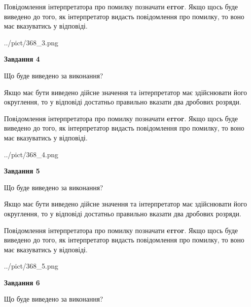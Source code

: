 \documentclass[12pt, ukrainian]{article}
\begin{document}
{\begin {Large}
Повідомлення інтерпретатора про помилку позначати \textbf{error}.
Якщо щось буде виведено до того, як інтерпретатор видасть повідомлення про помилку, 
то воно має вказуватись у відповіді. \par

\begin{center}
	{../pict/368_3.png}
\end{center}
\newpage

{\begin {center}\textbf{Завдання 4}\end {center}}\par
Що буде виведено за виконання? \par

Якщо має бути виведено дійсне значення та інтерпретатор має здійснювати його округлення, 
то у відповіді достатньо правильно вказати два дробових розряди.

Повідомлення інтерпретатора про помилку позначати \textbf{error}.
Якщо щось буде виведено до того, як інтерпретатор видасть повідомлення про помилку, 
то воно має вказуватись у відповіді. \par

\begin{center}
	{../pict/368_4.png}
\end{center}
\newpage

{\begin {center}\textbf{Завдання 5}\end {center}}\par
Що буде виведено за виконання? \par

Якщо має бути виведено дійсне значення та інтерпретатор має здійснювати його округлення, 
то у відповіді достатньо правильно вказати два дробових розряди.

Повідомлення інтерпретатора про помилку позначати \textbf{error}.
Якщо щось буде виведено до того, як інтерпретатор видасть повідомлення про помилку, 
то воно має вказуватись у відповіді. \par

\begin{center}
	{../pict/368_5.png}
\end{center}
\newpage

{\begin {center}\textbf{Завдання 6}\end {center}}\par
Що буде виведено за виконання? \par


\end{Large}}
\end{document}

